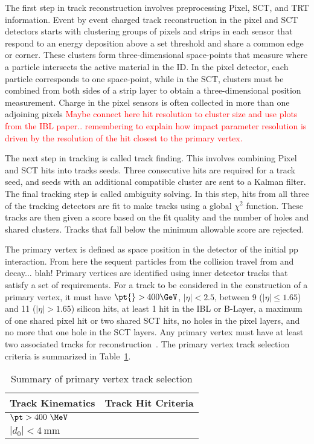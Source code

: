 The first step in track reconstruction involves preprocessing Pixel, SCT, and TRT information. Event by event charged track reconstruction in the pixel and SCT detectors starts with clustering groups of pixels and strips in each sensor that respond to an energy deposition above a set threshold and share a common edge or corner.  These clusters form three-dimensional space-points that measure where a particle intersects the active material in the ID.  In the pixel detector, each particle corresponds to one space-point, while in the SCT, clusters must be combined from both sides of a strip layer to obtain a three-dimensional position measurement.  Charge in the pixel sensors is often collected in more than one adjoining pixels \textcolor{red}{Maybe connect here hit resolution to cluster size and use plots from the IBL paper.. remembering to explain how impact parameter resolution is driven by the resolution of the hit closest to the primary vertex.} %


The next step in tracking is called track finding.  This involves combining Pixel and SCT hits into tracks seeds.  Three consecutive hits are required for a track seed, and seeds with an additional compatible cluster are sent to a Kalman filter.  The final tracking step is called ambiguity solving.  In this step, hits from all three of the tracking detectors are fit to make tracks using a global $\chi^2$ function.  These tracks are then given a score based on the fit quality and the number of holes and shared clusters.  Tracks that fall below the minimum allowable score are rejected.
 
The primary vertex is defined as space position in the detector of the initial pp interaction.  From here the sequent particles from the collision travel from and decay... blah!  Primary vertices are identified using inner detector tracks that satisfy a set of requirements.  For a track to be considered in the construction of a primary vertex, it must have $ \pt{} > 400\GeV$, $|\eta| < 2.5$, between 9 ($|\eta| \leq 1.65$) and 11 ($|\eta| > 1.65$) silicon hits, at least 1 hit in the IBL or B-Layer, a maximum of one shared pixel hit or two shared SCT hits, no holes in the pixel layers, and no more that one hole in the SCT layers.  Any primary vertex must have at least two associated tracks for reconstruction~\cite{1742-6596-898-4-042056}.  The primary vertex track selection criteria is summarized in Table~\ref{tab:pvtrk}.
\begin{table}
\tiny
\centering
\begin{tabular}{l|l}
  \small Track Kinematics & Track Hit Criteria  \\
  \hline
  $\pt > 400~\MeV$ & \\
  $|d_0|<4~\mathrm{mm}$ & \\
  \hline
\end{tabular}
\caption{Summary of primary vertex track selection}
\label{tab:pvtrk}
\end{table}
